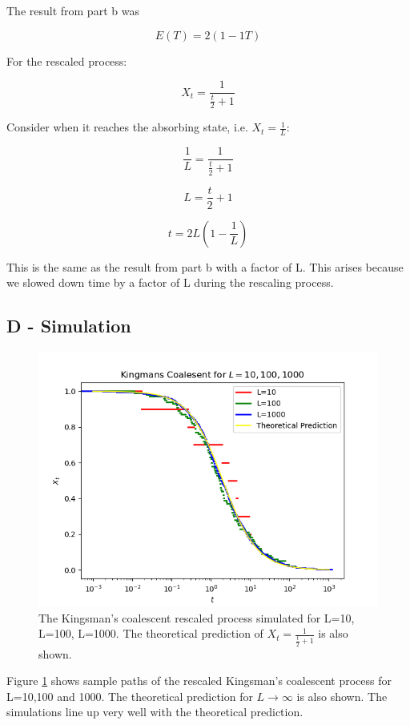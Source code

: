 \documentclass{article}
\begin{document}
The result from part b was

$$E(T) = 2(1 - {1}{T})$$

For the rescaled process:

$$X_t = \frac{1}{\frac{t}{2}+1}$$

Consider when it reaches the absorbing state, i.e. $X_t = \frac{1}{L}$:

$$\frac{1}{L} = \frac{1}{\frac{t}{2}+1}$$

$$ L = \frac{t}{2}+1$$

$$ t = 2L(1-\frac{1}{L})$$


This is the same as the result from part b with a factor of L. This arises because we slowed down time by a factor of L during the rescaling process. 



\subsection{D - Simulation}

\begin{figure}[H]
\includegraphics[scale=0.8]{kingsman_a.png} 
\caption{The Kingsman's coalescent rescaled process simulated for L=10, L=100, L=1000. The theoretical prediction of $X_t = \frac{1}{\frac{t}{2} + 1}$ is also shown.}
\label{fig:kingsman}
\end{figure}

Figure \ref{fig:kingsman} shows sample paths of the rescaled Kingsman's coalescent process for L=10,100 and 1000. The theoretical prediction for $L \to \infty$ is also shown. The simulations line up very well with the theoretical prediction.
\end{document}
